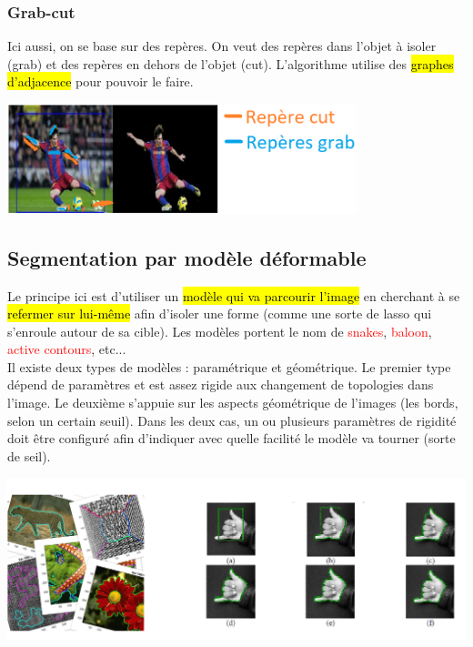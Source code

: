 \documentclass[letterpaper, 12pt]{article}
\newcommand{\alinea}{
\hspace*{0.5cm}}
\newcommand{\red}[1]{
	\textcolor{red}{#1}}
\begin{document}
		\subsubsection{Grab-cut}
			\alinea Ici aussi, on se base sur des repères. On veut des repères dans l'objet à isoler (grab) et des repères en dehors
				de l'objet (cut). L'algorithme utilise des \hl{graphes d'adjacence} pour pouvoir le faire.
			\begin{center}
				\includegraphics[width=4in]{Images/grab-cut}
			\end{center}
	\subsection{Segmentation par modèle déformable}
		\alinea Le principe ici est d'utiliser un \hl{modèle qui va parcourir l'image} en cherchant à se \hl{refermer sur lui-même} 
			afin d'isoler une forme (comme une sorte de lasso qui s'enroule autour de sa cible). Les modèles portent le nom
			de \red{snakes}, \red{baloon}, \red{active contours}, etc...\\
		\alinea Il existe deux types de modèles : paramétrique et géométrique. Le premier type dépend de paramètres et est assez rigide
			aux changement de topologies dans l'image. Le deuxième s'appuie sur les aspects géométrique de l'images (les bords, selon 
			un certain seuil). Dans les deux cas, un ou plusieurs paramètres de rigidité doit être configuré afin d'indiquer avec quelle
			facilité le modèle va tourner (sorte de seil).
		\begin{center}
			\includegraphics[width=6in]{Images/deformable}
		\end{center}
\end{document}
